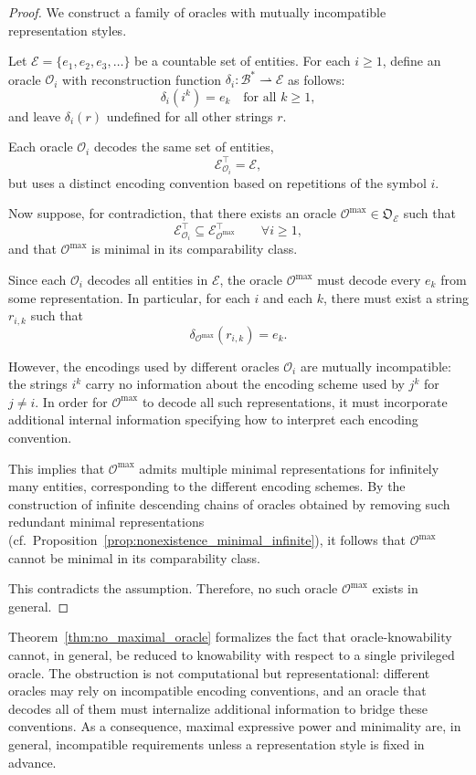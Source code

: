 \begin{proof}
We construct a family of oracles with mutually incompatible representation styles.

Let $\mathcal{E}=\{e_1,e_2,e_3,\dots\}$ be a countable set of entities. For each $i\ge 1$, define an oracle $\mathcal{O}_i$ with reconstruction function $\delta_i:\mathcal{B}^\ast \rightharpoonup \mathcal{E}$ as follows:
\[
\delta_i(i^k)=e_k \quad \text{for all } k\ge 1,
\]
and leave $\delta_i(r)$ undefined for all other strings $r$.

Each oracle $\mathcal{O}_i$ decodes the same set of entities,
\[
\mathcal{E}^\top_{\mathcal{O}_i} = \mathcal{E},
\]
but uses a distinct encoding convention based on repetitions of the symbol $i$.

Now suppose, for contradiction, that there exists an oracle $\mathcal{O}^{\max}\in\mathfrak{O}_{\mathcal{E}}$ such that
\[
\mathcal{E}^\top_{\mathcal{O}_i} \subseteq \mathcal{E}^\top_{\mathcal{O}^{\max}}
\qquad \forall i\ge 1,
\]
and that $\mathcal{O}^{\max}$ is minimal in its comparability class.

Since each $\mathcal{O}_i$ decodes all entities in $\mathcal{E}$, the oracle $\mathcal{O}^{\max}$ must decode every $e_k$ from some representation. In particular, for each $i$ and each $k$, there must exist a string $r_{i,k}$ such that
\[
\delta_{\mathcal{O}^{\max}}(r_{i,k}) = e_k.
\]

However, the encodings used by different oracles $\mathcal{O}_i$ are mutually incompatible: the strings $i^k$ carry no information about the encoding scheme used by $j^k$ for $j\neq i$. In order for $\mathcal{O}^{\max}$ to decode all such representations, it must incorporate additional internal information specifying how to interpret each encoding convention.

This implies that $\mathcal{O}^{\max}$ admits multiple minimal representations for infinitely many entities, corresponding to the different encoding schemes. By the construction of infinite descending chains of oracles obtained by removing such redundant minimal representations (cf.\ Proposition~\ref{prop:nonexistence_minimal_infinite}), it follows that $\mathcal{O}^{\max}$ cannot be minimal in its comparability class.

This contradicts the assumption. Therefore, no such oracle $\mathcal{O}^{\max}$ exists in general.
\end{proof}

Theorem~\ref{thm:no_maximal_oracle} formalizes the fact that oracle-knowability cannot, in general, be reduced to knowability with respect to a single privileged oracle. The obstruction is not computational but representational: different oracles may rely on incompatible encoding conventions, and an oracle that decodes all of them must internalize additional information to bridge these conventions. As a consequence, maximal expressive power and minimality are, in general, incompatible requirements unless a representation style is fixed in advance.

